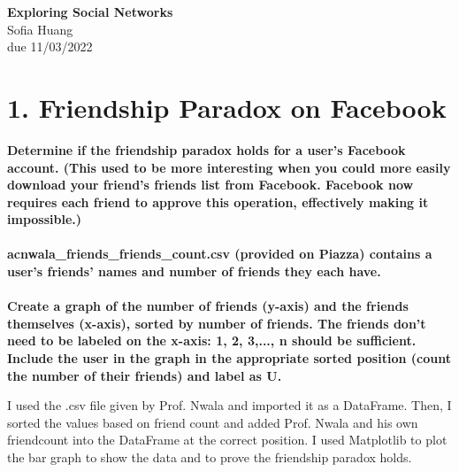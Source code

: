 \documentclass[12pt]{article}
\begin{document}
\begin{centering}
{\large\textbf{Exploring Social Networks}}\\ 
Sofia Huang\\
due 11/03/2022\\
\end{centering}


\section*{1. Friendship Paradox on Facebook}
\noindent \textbf{Determine if the friendship paradox holds for a user's Facebook account. (This used to be more interesting when you could more easily download your friend's friends list from Facebook. Facebook now requires each friend to approve this operation, effectively making it impossible.)\\
\\acnwala\_friends\_friends\_count.csv (provided on Piazza) contains a user's friends' names and number of friends they each have.\\
\\Create a graph of the number of friends (y-axis) and the friends themselves (x-axis), sorted by number of friends. The friends don't need to be labeled on the x-axis: 1, 2, 3,..., n should be sufficient. Include the user in the graph in the appropriate sorted position (count the number of their friends) and label as U.}

I used the .csv file given by Prof. Nwala and imported it as a DataFrame. Then, I sorted the values based on friend count and added Prof. Nwala and his own friendcount into the DataFrame at the correct position. I used Matplotlib to plot the bar graph to show the data and to prove the friendship paradox holds.
\end{document}

